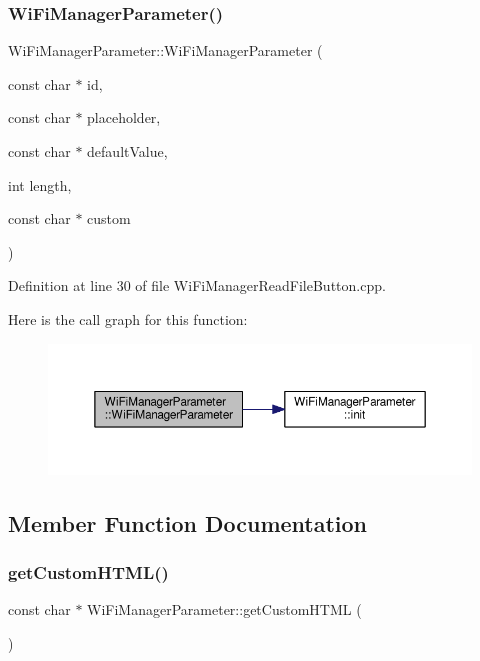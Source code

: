 \subsubsection{\texorpdfstring{Wi\+Fi\+Manager\+Parameter()}{WiFiManagerParameter()}\hspace{0.1cm}{\footnotesize\ttfamily [3/3]}}
{\footnotesize\ttfamily Wi\+Fi\+Manager\+Parameter\+::\+Wi\+Fi\+Manager\+Parameter (\begin{DoxyParamCaption}\item[{const char $\ast$}]{id,  }\item[{const char $\ast$}]{placeholder,  }\item[{const char $\ast$}]{default\+Value,  }\item[{int}]{length,  }\item[{const char $\ast$}]{custom }\end{DoxyParamCaption})}



Definition at line 30 of file Wi\+Fi\+Manager\+Read\+File\+Button.\+cpp.

Here is the call graph for this function\+:\nopagebreak
\begin{figure}[H]
\begin{center}
\leavevmode
\includegraphics[width=350pt]{class_wi_fi_manager_parameter_a45967e1d29d52f5fc8e47e99cb693b98_cgraph}
\end{center}
\end{figure}


\subsection{Member Function Documentation}
\mbox{\label{class_wi_fi_manager_parameter_a596273c189eb40107500cee3ad31b13b}} 
\subsubsection{\texorpdfstring{get\+Custom\+H\+T\+M\+L()}{getCustomHTML()}}
{\footnotesize\ttfamily const char $\ast$ Wi\+Fi\+Manager\+Parameter\+::get\+Custom\+H\+T\+ML (\begin{DoxyParamCaption}{ }\end{DoxyParamCaption})}



